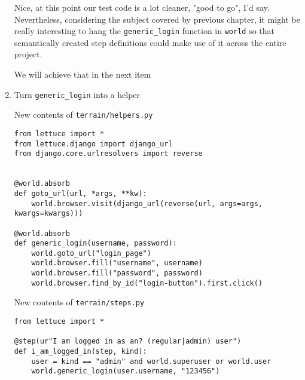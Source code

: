 \documentclass[letterpaper]{article}
\begin{document}
\begin{enumerate}
\noindent
Nice, at this point our test code is a lot cleaner, "good to go", I'd
say.  Nevertheless, considering the subject covered by previous
chapter, it might be really interesting to hang the
\texttt{generic\_login} function in \texttt{world} so that
semantically created step definitions could make use of it across the
entire project.

\noindent
We will achieve that in the next item

\newpage

\item{Turn \texttt{generic\_login} into a helper}

\hspace{0.2pt}

\noindent
\large New contents of \texttt{terrain/helpers.py}\footnotesize
\newline
\begin{verbatim}
from lettuce import *
from lettuce.django import django_url
from django.core.urlresolvers import reverse


@world.absorb
def goto_url(url, *args, **kw):
    world.browser.visit(django_url(reverse(url, args=args, kwargs=kwargs)))

@world.absorb
def generic_login(username, password):
    world.goto_url("login_page")
    world.browser.fill("username", username)
    world.browser.fill("password", password)
    world.browser.find_by_id("login-button").first.click()
\end{verbatim}

\noindent
\large New contents of \texttt{terrain/steps.py}\footnotesize

\begin{verbatim}
from lettuce import *

@step(ur"I am logged in as an? (regular|admin) user")
def i_am_logged_in(step, kind):
    user = kind == "admin" and world.superuser or world.user
    world.generic_login(user.username, "123456")
\end{verbatim}
\end{enumerate}
\end{document}
